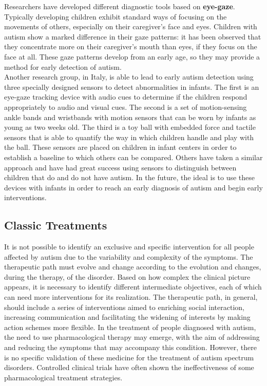 Researchers have developed different diagnostic tools based on \textbf{eye-gaze}.
Typically developing children exhibit standard ways of focusing on the movements of others, especially on their caregiver’s face and eyes. Children with autism show a marked difference in their gaze patterns: it has been observed that they concentrate more on their caregiver’s mouth than eyes, if they focus on the face at all. These gaze patterns develop from an early age, so they may provide a method for early detection of autism.\\ 
Another research group, in Italy, is able to lead to early autism detection using three specially designed sensors to detect abnormalities in infants. The first is an eye-gaze tracking device with audio cues to determine if the children respond appropriately to audio and visual cues. The second is a set of motion-sensing ankle bands and wristbands with motion sensors that can be worn by infants as young as two weeks old. The third is a toy ball with embedded force and tactile sensors that is able to quantify the way in which children
handle and play with the ball. These sensors are placed on children in infant centers in order to establish a baseline to which others can be compared.
Others have taken a similar approach and have had great success using sensors to distinguish between children that do and do not have autism. In the future, the ideal is to use these devices with infants in order to reach an early diagnosis of autism and begin early interventions. 

\subsection{Classic Treatments}
It is not possible to identify an exclusive and specific intervention for all people affected by autism due to the variability and complexity of the symptoms. The therapeutic path must evolve and change according to the evolution and changes, during the therapy, of the disorder. Based on how complex the clinical picture appears, it is necessary to identify different intermediate objectives, each of which can need more interventions for its realization.
The therapeutic path, in general, should include a series of interventions aimed to enriching social interaction, increasing communication and facilitating the widening of interests by making action schemes more flexible.
In the treatment of people diagnosed with autism, the need to use pharmacological therapy may emerge, with the aim of addressing and reducing the symptoms that may accompany this condition. However, there is no specific validation of these medicine for the treatment of autism spectrum disorders. Controlled clinical trials have often shown the ineffectiveness of some pharmacological treatment strategies.
